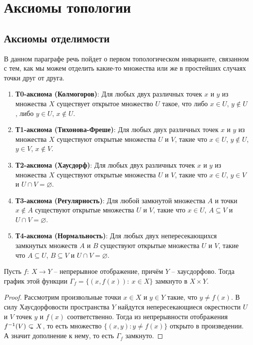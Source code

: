 
\newpage
\section{Аксиомы топологии}

\subsection{Аксиомы отделимости}
В данном параграфе речь пойдет о первом топологическом инварианте, связанном с тем, как мы можем отделить какие-то множества или же в простейших случаях точки друг от друга.
\begin{enumerate}
	\item \textbf{Т0-аксиома (Колмогоров)}: Для любых двух различных точек \( x \) и \( y \) из множества \( X \) существует открытое множество \( U \) такое, что либо \( x \in U \), \( y \notin U \), либо \( y \in U \), \( x \notin U \).
    \item \textbf{Т1-аксиома (Тихонова-Фреше)}: Для любых двух различных точек \( x \) и \( y \) из множества \( X \) существуют открытые множества \( U \) и \( V \), такие что \( x \in U \), \( y \notin U \), \( y \in V \), \( x \notin V \).
    
    \item \textbf{Т2-аксиома (Хаусдорф)}: Для любых двух различных точек \( x \) и \( y \) из множества \( X \) существуют открытые множества \( U \) и \( V \), такие что \( x \in U \), \( y \in V \) и \( U \cap V = \varnothing \).
    
    \item \textbf{Т3-аксиома (Регулярность)}: Для любой замкнутой множества \( A \) и точки \( x \notin A \) существуют открытые множества \( U \) и \( V \), такие что \( x \in U \), \( A \subseteq V \) и \( U \cap V = \varnothing \).
    
    \item \textbf{Т4-аксиома (Нормальность)}: Для любых двух непересекающихся замкнутых множеств \( A \) и \( B \) существуют открытые множества \( U \) и \( V \), такие что \( A \subseteq U \), \( B \subseteq V \) и \( U \cap V = \varnothing \).
\end{enumerate}

\begin{statement}
	Пусть \(f: \ X \to Y\) -- непрерывное отображение, причём \(Y\) -- хаусдорфово. Тогда график этой функции \(\Gamma_f = \{(x, f(x)): \ x \in X\}\) замкнуто в \(X \times Y\).
\end{statement}
\begin{proof}
	Рассмотрим произвольные точки $x \in X$ и $y \in Y$ такие, что $y \neq f(x)$.
	В силу Хаусдорфовости пространства $Y$ найдутся непересекающиеся окрестности $U$ и $V$ точек $y$ и $f(x)$ соответственно. Тогда из непрерывности отображения $f^{-1}(V) \open X$, то есть множество \(\{(x, y): y \neq f(x)\}\) открыто в произведении. А значит дополнение к нему, то есть \(\Gamma_f\) замкнуто.
\end{proof}

